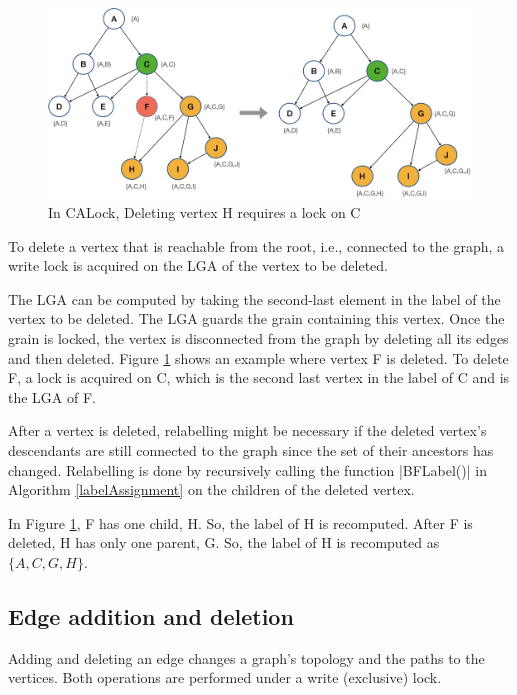 \begin{figure}[h]
	\centering
	\captionsetup{justification=centering}
	\includegraphics[width=\columnwidth]{figures/CALock_to_delete_vertex.png}
	\caption{In CALock, Deleting vertex H requires a lock on C}
	\label{fig:calockdelete}
\end{figure}

To delete a vertex that is reachable from the root, i.e., connected to the graph, a write lock is acquired on the LGA of the vertex to be deleted. 

The LGA can be computed by taking the second-last element in the label of the vertex to be deleted. The LGA guards the grain containing this vertex. 
Once the grain is locked, the vertex is disconnected from the graph by deleting all its edges and then deleted. Figure \ref{fig:calockdelete} shows an example where vertex F is deleted. To delete F, a lock is acquired on C, which is the second last vertex in the label of C and is the LGA of F.

After a vertex is deleted, relabelling might be necessary if the deleted vertex's descendants are still connected to the graph since the set of their ancestors has changed. Relabelling is done by recursively calling the function \inline|BFLabel()| in Algorithm \ref{labelAssignment} on the children of the deleted vertex. 

In Figure \ref{fig:calockdelete}, F has one child, H. So, the label of H is recomputed. After F is deleted, H has only one parent, G. So, the label of H is recomputed as $\{A, C, G, H\}$.



\subsection{Edge addition and deletion}
Adding and deleting an edge changes a graph's topology and the paths to the vertices. 
Both operations are performed under a write (exclusive) lock. 

